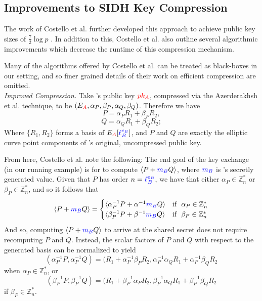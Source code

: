 \subsection{Improvements to SIDH Key Compression}
\label{subsec:costcompression}

The work of Costello et al. further developed this approach to achieve public key sizes of $\frac{7}{2}\log p$ \cite{pkcomp}. In addition to this, Costello et al. also outline several algorithmic improvements which decrease the runtime of this compression mechanism.

Many of the algorithms offered by Costello et al. can be treated as black-boxes in our setting, and so finer grained details of their work on efficient compression are omitted.\\

\noindent
\textit{Improved Compression.} Take \alice's public key $\textcolor{red}{pk_A}$, compressed via the Azerderakhsh et al. technique, to be $(E_{\textcolor{red}{A}}, \alpha_{P}, \beta_{P}, \alpha_{Q}, \beta_{Q})$. Therefore we have
$$
P = \alpha_{P}R_1 + \beta_{P}R_2,
$$
$$
Q = \alpha_{Q}R_1 + \beta_{Q}R_2;
$$
Where $\{R_1, R_2\}$ forms a basis of $E_{\textcolor{red}{A}}[\textcolor{blue}{\ell_{B}^{e_B}}]$, and $P$ and $Q$ are exactly the elliptic curve point components of \alice's original, uncompressed public key.

From here, Costello et al. note the following: The end goal of the key exchange (in our running example) is for \bob to compute $\langle P + \textcolor{blue}{m_B} Q\rangle$, where $\textcolor{blue}{m_B}$ is \bob's secretly generated value. Given that $P$ has order $n = \textcolor{blue}{\ell_{B}^{e_B}}$, we have that either $\alpha_{P} \in \mathbb{Z}^{*}_{n}$ or $\beta_{P} \in \mathbb{Z}^{*}_{n}$, and so it follows that
$$
\langle P + \textcolor{blue}{m_B} Q \rangle =  \begin{cases}
							\langle \alpha^{-1}_{P}P + \alpha^{-1}\textcolor{blue}{m_B} Q \rangle & \text{if }\ \alpha_{P} \in \mathbb{Z}^{*}_{n}\\
							\langle \beta^{-1}_{P}P + \beta^{-1}\textcolor{blue}{m_B} Q \rangle & \text{if }\ \beta_{P} \in \mathbb{Z}^{*}_{n}
							\end{cases}
$$
And so, computing $\langle P + \textcolor{blue}{m_B} Q\rangle$ to arrive at the shared secret does not require recomputing $P$ and $Q$. Instead, the scalar factors of $P$ and $Q$ with respect to the generated basis can be normalized to yield
$$
(\alpha^{-1}_{P}P, \alpha^{-1}_{P}Q) = (R_{1} + \alpha^{-1}_{P}\beta_{P} R_{2}, \alpha^{-1}_{P}\alpha_{Q}R_{1} + \alpha^{-1}_{P}\beta_{Q}R_{2}
$$
when $\alpha_{P} \in \mathbb{Z}^{*}_{n}$, or
$$
(\beta^{-1}_{P}P, \beta^{-1}_{P}Q) = (R_{1} + \beta^{-1}_{P}\alpha_{P} R_{2}, \beta^{-1}_{P}\alpha_{Q}R_{1} + \beta^{-1}_{P}\beta_{Q}R_{2}
$$
if $\beta_{P} \in \mathbb{Z}^{*}_{n}$.\\

